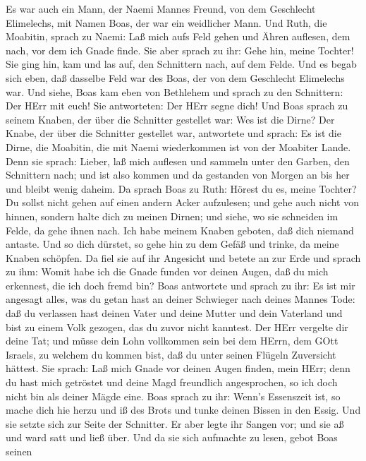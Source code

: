  Es war auch ein Mann, der Naemi Mannes Freund, von dem
Geschlecht Elimelechs, mit Namen Boas, der war ein weidlicher Mann.
 Und Ruth, die Moabitin, sprach zu Naemi: Laß mich aufs Feld
gehen und Ähren auflesen, dem nach, vor dem ich Gnade finde. Sie aber
sprach zu ihr: Gehe hin, meine Tochter!  Sie ging hin, kam
und las auf, den Schnittern nach, auf dem Felde. Und es begab sich eben,
daß dasselbe Feld war des Boas, der von dem Geschlecht Elimelechs war.
 Und siehe, Boas kam eben von Bethlehem und sprach zu den
Schnittern: Der HErr mit euch! Sie antworteten: Der HErr segne dich!
 Und Boas sprach zu seinem Knaben, der über die Schnitter
gestellet war: Wes ist die Dirne?  Der Knabe, der über die
Schnitter gestellet war, antwortete und sprach: Es ist die Dirne, die
Moabitin, die mit Naemi wiederkommen ist von der Moabiter Lande.
 Denn sie sprach: Lieber, laß mich auflesen und sammeln
unter den Garben, den Schnittern nach; und ist also kommen und da
gestanden von Morgen an bis her und bleibt wenig daheim.  Da
sprach Boas zu Ruth: Hörest du es, meine Tochter? Du sollst nicht gehen
auf einen andern Acker aufzulesen; und gehe auch nicht von hinnen,
sondern halte dich zu meinen Dirnen;  und siehe, wo sie
schneiden im Felde, da gehe ihnen nach. Ich habe meinem Knaben geboten,
daß dich niemand antaste. Und so dich dürstet, so gehe hin zu dem Gefäß
und trinke, da meine Knaben schöpfen.  Da fiel sie auf ihr
Angesicht und betete an zur Erde und sprach zu ihm: Womit habe ich die
Gnade funden vor deinen Augen, daß du mich erkennest, die ich doch fremd
bin?  Boas antwortete und sprach zu ihr: Es ist mir
angesagt alles, was du getan hast an deiner Schwieger nach deines Mannes
Tode: daß du verlassen hast deinen Vater und deine Mutter und dein
Vaterland und bist zu einem Volk gezogen, das du zuvor nicht kanntest.
 Der HErr vergelte dir deine Tat; und müsse dein Lohn
vollkommen sein bei dem HErrn, dem GOtt Israels, zu welchem du kommen
bist, daß du unter seinen Flügeln Zuversicht hättest.  Sie
sprach: Laß mich Gnade vor deinen Augen finden, mein HErr; denn du hast
mich getröstet und deine Magd freundlich angesprochen, so ich doch nicht
bin als deiner Mägde eine.  Boas sprach zu ihr: Wenn's
Essenszeit ist, so mache dich hie herzu und iß des Brots und tunke
deinen Bissen in den Essig. Und sie setzte sich zur Seite der Schnitter.
Er aber legte ihr Sangen vor; und sie aß und ward satt und ließ über.
 Und da sie sich aufmachte zu lesen, gebot Boas seinen
